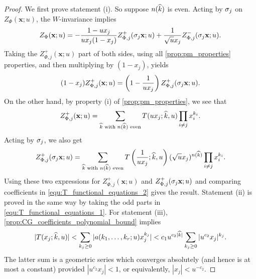 \documentclass[12pt,reqno,oneside]{amsart}
\begin{document}
    \begin{proof}
        We first prove statement (i). So suppose $n(\widehat{k})$ is even. Acting by $\sigma_{j}$ on $Z_{\Phi}(\mathbf{x};u)$, the $W$-invariance implies
        \begin{equation}\label{equ:T_functional_equations_1}
            Z_{\Phi}(\mathbf{x};u) = -\frac{1-ux_{j}}{ux_{j}(1-x_{j})}Z_{\Phi,j}^{+}(\sigma_{j}\mathbf{x};u)+\frac{1}{\sqrt{u}x_{j}}Z_{\Phi,j}^{-}(\sigma_{j}\mathbf{x};u).
        \end{equation}
        Taking the $Z_{\Phi,j}^{+}(\mathbf{x};u)$ part of both sides, using all \cref{prop:pm_properties} properties, and then multiplying by $(1-x_{j})$, yields
        \begin{equation}\label{equ:T_functional_equations_2}
            (1-x_{j})Z_{\Phi,j}^{+}(\mathbf{x};u) = \left(1-\frac{1}{ux_{j}}\right)Z_{\Phi,j}^{+}(\sigma_{j}\mathbf{x};u).
        \end{equation}
        On the other hand, by property (i) of \cref{prop:pm_properties}, we see that
        \[
            Z_{\Phi,j}^{+}(\mathbf{x};u) = \sum_{\text{$\widehat{k}$ with $n(\widehat{k})$ even}}T(ux_{j};\widehat{k},u)\prod_{i \neq j}x_{i}^{k_{i}}.
        \]
        Acting by $\sigma_{j}$, we also get
        \[
            Z_{\Phi,j}^{+}(\sigma_{j}\mathbf{x};u) = \sum_{\text{$\widehat{k}$ with $n(\widehat{k})$ even}}T\left(\frac{1}{ux_{j}};\widehat{k},u\right)(\sqrt{u}x_{j})^{n(\widehat{k})}\prod_{i \neq j}x_{i}^{k_{i}}.
        \]
        Using these two expressions for $Z_{\Phi,j}^{+}(\mathbf{x};u)$ and $Z_{\Phi,j}^{+}(\sigma_{j}\mathbf{x};u)$ and comparing coefficients in \cref{equ:T_functional_equations_2} gives the result. Statement (ii) is proved in the same way by taking the odd parts in \cref{equ:T_functional_equations_1}. For statement (iii), \cref{prop:CG_coefficients_polynomial_bound} implies
        \[
            |T(x_{j};\widehat{k},u)| < \sum_{k_{j} \ge 0}|a(k_{1},\ldots,k_{r};u)x_{j}^{k_{j}}| < c_{1}u^{c_{2}|\widehat{k}|}\sum_{k_{j} \ge 0}|u^{c_{2}}x_{j}|^{k_{j}}.
        \]
        The latter sum is a geometric series which converges absolutely (and hence is at most a constant) provided $|u^{c_{2}}x_{j}| < 1$, or equivalently, $|x_{j}| < u^{-c_{2}}$.
    \end{proof}
\end{document}
